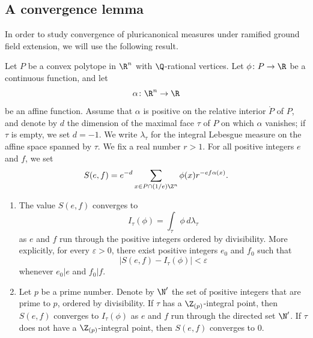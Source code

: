 \subsection{A convergence lemma}
In order to study convergence of pluricanonical measures under ramified ground field extension, we will use the following result.
\begin{lemma}\label{lemm:int}
Let $P$ be a convex polytope in $\R^n$ with $\Q$-rational vertices. Let $\phi\colon P\to \R$ be a continuous function, and let
\[
\alpha\colon \R^{n}\to \R
\]
be an affine function.
Assume that $\alpha$ is positive on the relative interior $\mathring{P}$ of $P$, and denote by $d$ the dimension of the maximal face $\tau$ of $P$ on which $\alpha$ vanishes; if $\tau$ is empty, we set $d=-1$.
We write $\lambda_{\tau}$ for the integral Lebesgue measure on the affine space spanned by $\tau$.
We fix a real number $r>1$. For all positive integers $e$ and $f$, we set
\[
S(e,f)=e^{-d}\sum_{x\in P\cap (1/e)\Z^n}\phi(x)r^{-ef\alpha(x)}.
\]

\begin{enumerate}
\item \label{it:convwild} The value $S(e,f)$ converges to
\[
I_{\tau}(\phi)=\int_{\tau}\phi\, d\lambda_{\tau}
\]
as $e$ and $f$ run through the positive integers ordered by divisibility. More explicitly, for every $\varepsilon>0$, there exist positive integers $e_0$ and $f_0$ such that
\[
|S(e,f)-I_{\tau}(\phi)|<\varepsilon
\]
whenever $e_0|e$ and $f_0|f$.

\item \label{it:convtame} Let $p$ be a prime number. Denote by $\N'$ the set of positive integers that are prime to $p$, ordered by divisibility. If $\tau$ has a $\Z_{(p)}$-integral point, then
$S(e,f)$ converges to $I_{\tau}(\phi)$ as $e$ and $f$ run through the directed set $\N'$. If $\tau$ does not have a $\Z_{(p)}$-integral point, then $S(e,f)$ converges to $0$.
\end{enumerate}
\end{lemma}
